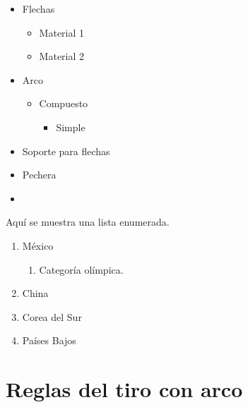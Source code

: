 \documentclass[12pt, legalpaper]{article}
\begin{document}
\begin{itemize}  %
    \item[\ding{36}] Flechas
        \begin{itemize} %
            \item[\ding{116}] Material 1
            \item Material 2
        \end{itemize}
    \item[\ding{61}] Arco
        \begin{itemize} %
            \item Compuesto
                \begin{itemize} %
                    \item Simple
                \end{itemize}
        \end{itemize}
    \item [\ding{61}]Soporte para flechas
    \item[\ding{61}] Pechera
    \item 
\end{itemize}

Aquí se muestra una lista enumerada.

\begin{enumerate}
    \item México
        \begin{enumerate}
            \item Categoría olímpica.
        \end{enumerate}
    \item China
    \item Corea del Sur
    \item Países Bajos
\end{enumerate}

\section{Reglas del tiro con arco}

\blindtext
\end{document}
